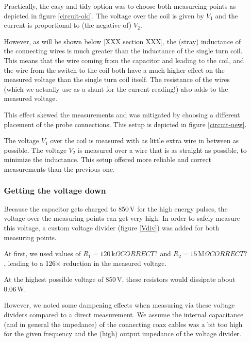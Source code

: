Practically, the easy and tidy option was to choose both measureing points 
as depicted in figure \ref{circuit-old}. The voltage over the coil is given 
by $V_1$ and the current is proportional to (the negative of) $V_2$.


However, as will be shown below [XXX section XXX], the (stray) inductance 
of the connecting wires is much greater than the inductance of the single 
turn coil. This means that the wire coming from the capacitor and leading 
to the coil, and the wire from the switch to the coil both have a much 
higher effect on the measured voltage than the single turn coil itself.  
The resistance of the wires (which we actually use as a shunt for the 
current reading!) also adds to the measured voltage.

This effect skewed the measurements and was mitigated by choosing a 
different placement of the probe connections. This setup is depicted in 
figure \ref{circuit-new}.


The voltage $V_1$ over the coil is measured with as little extra wire in 
between as possible. The voltage $V_2$ is measured over a wire that is as 
straight as possible, to minimize the inductance. This setup offered more 
reliable and correct measurements than the previous one.

\subsubsection{Getting the voltage down}
Because the capacitor gets charged to 850\,V for the high energy pulses, 
the voltage over the measuring points can get very high. In order to safely 
measure this voltage, a custom voltage divider (figure \ref{Vdiv}) was 
added for both measuring points.


At first, we used values of $R_1 = 120\,\mathrm{k}\Omega CORRECT?$ and $R_2 
= 15\,\mathrm{M}\Omega CORRECT?$, leading to a 126$\times$ reduction in the 
measured voltage.

At the highest possible voltage of 850\,V, these resistors would dissipate 
about 0.06\,W.

However, we noted some dampening effects when measuring via these voltage 
dividers compared to a direct measurement. We assume the internal 
capacitance (and in general the impedance) of the connecting coax cables 
was a bit too high for the given frequency and the (high) output impedance 
of the voltage divider.

